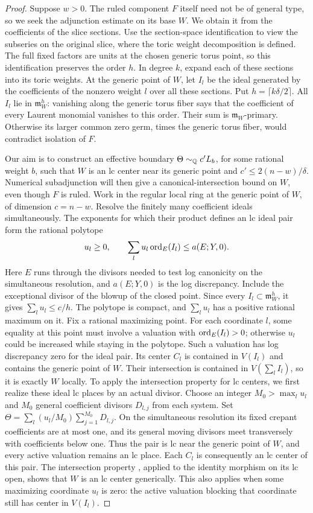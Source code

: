 \begin{proof}
Suppose \(w>0\).  The ruled component \(F\) itself need not be of
general type, so we seek the adjunction estimate on its base \(W\).
We obtain it from the coefficients of the slice sections. Use the
section-space identification to view the subseries on the original
slice, where the toric weight decomposition is defined. The full fixed
factors are units at the chosen generic torus point, so this identification
preserves the order \(h\). In degree \(k\), expand each of these sections
into its toric weights. At the generic point of \(W\), let \(I_l\) be
the ideal generated by the coefficients of the nonzero weight \(l\)
over all these sections.  Put \(h=\lceil k\delta/2\rceil\).
All \(I_l\) lie in \(\mathfrak m_W^h\): vanishing along the generic
torus fiber says that the coefficient of every Laurent monomial
vanishes to this order.  Their sum is
\(\mathfrak m_W\)-primary.  Otherwise its larger common zero germ,
times the generic torus fiber, would contradict isolation of \(F\).

Our aim is to construct an effective boundary
\(\Theta\sim_{\mathbb{Q}}c'L_b\), for some rational weight \(b\), such that
\(W\) is an lc center near its generic point and
\(c'\le2(n-w)/\delta\). Numerical subadjunction will then give a
canonical-intersection bound on \(W\), even though \(F\) is ruled.
Work in the regular local ring at the generic point of \(W\), of
dimension \(c=n-w\). Resolve the finitely many coefficient ideals
simultaneously. The exponents for which their product defines an lc
ideal pair form the rational polytope
\[
 u_l\ge0,\qquad
 \sum_lu_l\operatorname{ord}_E(I_l)\le a(E;Y,0).
\]
Here \(E\) runs through the divisors needed to test log canonicity on
the simultaneous resolution, and \(a(E;Y,0)\) is the log discrepancy.
Include the exceptional divisor of the blowup of the closed point.
Since every \(I_l\subset\mathfrak m_W^h\), it gives
\(\sum_lu_l\le c/h\). The polytope is compact, and \(\sum_lu_l\)
has a positive rational maximum on it. Fix a rational maximizing point.
For each coordinate \(l\), some equality at this point must involve
a valuation with \(\operatorname{ord}_E(I_l)>0\); otherwise \(u_l\) could be
increased while staying in the polytope. Such a valuation has log
discrepancy zero for the ideal pair. Its center \(C_l\) is contained
in \(V(I_l)\) and contains the generic point of \(W\). Their intersection
is contained in \(V(\sum_l I_l)\), so it is exactly \(W\) locally.
To apply the intersection property for lc centers, we first realize
these ideal lc places by an actual divisor. Choose an integer
\(M_0>\max_l u_l\) and \(M_0\) general coefficient divisors
\(D_{l,j}\) from each system.  Set
\(\Theta=\sum_l(u_l/M_0)\sum_{j=1}^{M_0}D_{l,j}\).
On the simultaneous resolution its fixed crepant coefficients are
at most one, and its general moving divisors meet transversely
with coefficients below one.  Thus the pair is lc near the generic
point of \(W\), and every active valuation remains an lc place.
Each \(C_l\) is consequently an lc center of this pair. The intersection
property \cite[Theorem~1.7]{KollarKovacs2010}, applied to the identity
morphism on its lc open, shows that \(W\) is an lc center generically.
This also applies when some
maximizing coordinate \(u_l\) is zero: the active valuation blocking that
coordinate still has center in \(V(I_l)\).


\end{proof}
